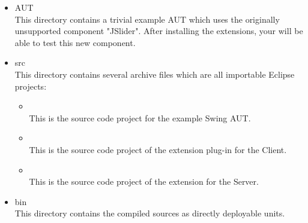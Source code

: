 \begin{itemize}
 \item AUT \\
 This directory contains a trivial example AUT which uses the originally unsupported component "JSlider". 
 After installing the extensions, your \app{} will be able to test this new component.
 \item src \\
 This directory contains several archive files which are all importable Eclipse projects:
 \begin{itemize}
 	\item {} \\
 	This is the source code project for the example Swing AUT.
 	\item {} \\
 	This is the source code project of the extension plug-in for the \app{} Client.
 	\item {} \\
 	This is the source code project of the extension for the \app{} Server.
 \end{itemize}
 \item bin \\
 This directory contains the compiled sources as directly deployable units.
\end{itemize}
